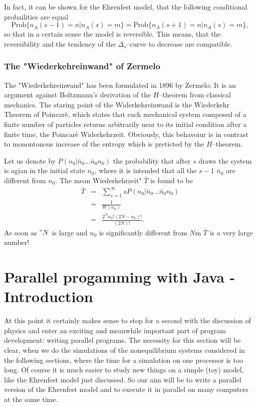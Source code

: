 In fact, it can be shown for the Ehrenfest model, that the following 
conditional probailities are equal
\begin{displaymath}
  \textrm{Prob} \{n_A(s-1)=n|n_A(s)=m \} = 
  \textrm{Prob} \{n_A(s+1)=n | n_A(s)=m \}, 
\end{displaymath}
so that in a certain sense  the model is reversible. This means, that the
reversibility and the tendency of the $\Delta_s$--curve to decrease are
compatible.

\subsubsection{The "Wiederkehreinwand" of Zermelo}
The "Wiederkehreinwand" has been formulated in 1896 by Zermelo. It is an
argument against Boltzmann's derivation  of the $H$--theorem from classical
mechanics. The staring point of the Widerkehreinwand is the Wiederkehr Theorem
of Poincar\`e, which states that each mechanical system composed of a finite
number of particles returns arbitrarily near to its initial condition after a
finite time, the Poincar\`e Widerkehrzeit. Obviously, this  behavoiur is in
contrast to monontonous increase of the entropy which is preticted by the
$H$--theorem. 

Let us denote by $P(n_0| \bar{n}_0 \ldots \bar{n}_0 n_0)$ the probability that
after $s$ draws the system is agian in the initial state $n_0$, where it is
intended that all the $s-1$ $\bar{n}_0$ are different from $n_0$. The mean
Wiederkehrzeit" $\bar{T}$ is found to be
\begin{eqnarray*}
  \bar{T} &=& \sum_{s=1}^{\infty} s P(n_0| \bar{n}_0 \ldots \bar{n}_0 n_0) \\
          & = & \frac{1}{W(n_0)} \\
          & = & \frac{2^N n_0! (2N-n_0)! }{(2N)!}.
\end{eqnarray*}
As soon as $"N$ is large and $n_0$ is significantly different from $N$m $\bar{T}$
is a very large number!


\section{Parallel progamming with Java - Introduction}
\label{sec:ParallelJava}

At this point it certainly makes sense to stop for a second with the 
discussion of physics and enter an exciting and meanwhile important 
part of program development: writing parallel programs. The necessity
for this section will be clear, when we do the simulations of the 
nonequilibrium systems considered in the following sections, where
the time for a simulation on one processor is too long. Of 
course it is much easier to study new things on a simple (toy) model,
like the Ehrenfest model just discussed. So our aim will be to write
a parallel version of the Ehrenfest model and to execute it in parallel
on many computers at the same time.

